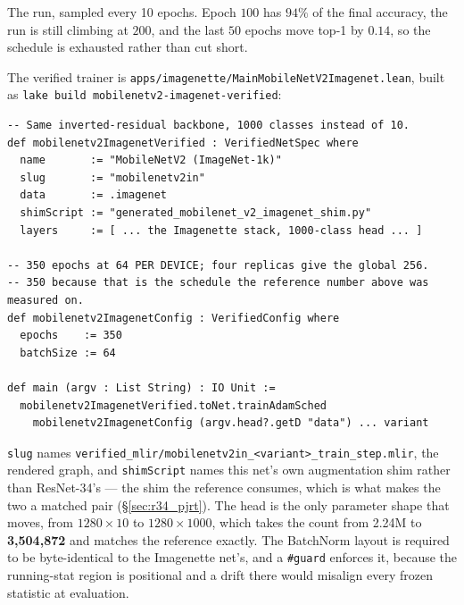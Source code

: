 \noindent The run, sampled every 10 epochs. Epoch $100$ has $94\%$ of the
final accuracy, the run is still climbing at $200$, and the last $50$
epochs move top-1 by $0.14$, so the schedule is exhausted rather than cut
short.

\label{sec:mnv2_phase4}

The verified trainer is
\texttt{apps/imagenette/MainMobileNetV2Imagenet.lean}, built as
\texttt{lake build mobilenetv2-\allowbreak imagenet-\allowbreak verified}:

\begin{verbatim}
-- Same inverted-residual backbone, 1000 classes instead of 10.
def mobilenetv2ImagenetVerified : VerifiedNetSpec where
  name       := "MobileNetV2 (ImageNet-1k)"
  slug       := "mobilenetv2in"
  data       := .imagenet
  shimScript := "generated_mobilenet_v2_imagenet_shim.py"
  layers     := [ ... the Imagenette stack, 1000-class head ... ]

-- 350 epochs at 64 PER DEVICE; four replicas give the global 256.
-- 350 because that is the schedule the reference number above was measured on.
def mobilenetv2ImagenetConfig : VerifiedConfig where
  epochs    := 350
  batchSize := 64

def main (argv : List String) : IO Unit :=
  mobilenetv2ImagenetVerified.toNet.trainAdamSched
    mobilenetv2ImagenetConfig (argv.head?.getD "data") ... variant
\end{verbatim}

\noindent \texttt{slug} names
\texttt{verified\_mlir/mobilenetv2in\_<variant>\_train\_step.mlir}, the
rendered graph, and \texttt{shimScript} names this net's own augmentation shim rather
than ResNet-34's --- the shim the reference consumes, which is what makes
the two a matched pair (\S\ref{sec:r34_pjrt}). The head is the only parameter shape that
moves, from $1280 \times 10$ to $1280 \times 1000$, which takes the count
from 2.24M to \textbf{3,504,872} and matches the reference exactly.
The BatchNorm layout is required to be byte-identical to the Imagenette
net's, and a \texttt{\#guard} enforces it, because the running-stat region
is positional and a drift there would misalign every frozen statistic at
evaluation.

